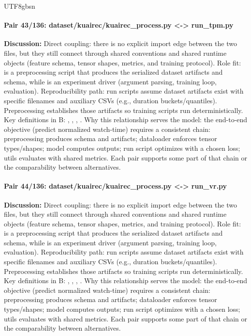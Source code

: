 \documentclass[11pt]{article}
\begin{document}
\begin{CJK*}{UTF8}{gbsn}
\paragraph{Pair 43/136: dataset/kuairec/kuairec\_process.py <-> run\_tpm.py}
\textbf{Discussion:} Direct coupling: there is no explicit import edge between the two files, but they still connect through shared conventions and shared runtime objects (feature schema, tensor shapes, metrics, and training protocol). Role fit: \texttt{} is a preprocessing script that produces the serialized dataset artifacts and schema, while \texttt{} is an experiment driver (argument parsing, training loop, evaluation). Reproducibility path: run scripts assume dataset artifacts exist with specific filenames and auxiliary CSVs (e.g., duration buckets/quantiles). Preprocessing establishes those artifacts so training scripts run deterministically. Key definitions in B: \texttt{}, \texttt{}, \texttt{}, \texttt{}. Why this relationship serves the model: the end-to-end objective (predict normalized watch-time) requires a consistent chain: preprocessing produces schema and artifacts; dataloader enforces tensor types/shapes; model computes outputs; run script optimizes with a chosen loss; utils evaluates with shared metrics. Each pair supports some part of that chain or the comparability between alternatives.

\paragraph{Pair 44/136: dataset/kuairec/kuairec\_process.py <-> run\_vr.py}
\textbf{Discussion:} Direct coupling: there is no explicit import edge between the two files, but they still connect through shared conventions and shared runtime objects (feature schema, tensor shapes, metrics, and training protocol). Role fit: \texttt{} is a preprocessing script that produces the serialized dataset artifacts and schema, while \texttt{} is an experiment driver (argument parsing, training loop, evaluation). Reproducibility path: run scripts assume dataset artifacts exist with specific filenames and auxiliary CSVs (e.g., duration buckets/quantiles). Preprocessing establishes those artifacts so training scripts run deterministically. Key definitions in B: \texttt{}, \texttt{}, \texttt{}, \texttt{}. Why this relationship serves the model: the end-to-end objective (predict normalized watch-time) requires a consistent chain: preprocessing produces schema and artifacts; dataloader enforces tensor types/shapes; model computes outputs; run script optimizes with a chosen loss; utils evaluates with shared metrics. Each pair supports some part of that chain or the comparability between alternatives.


\end{CJK*}
\end{document}
